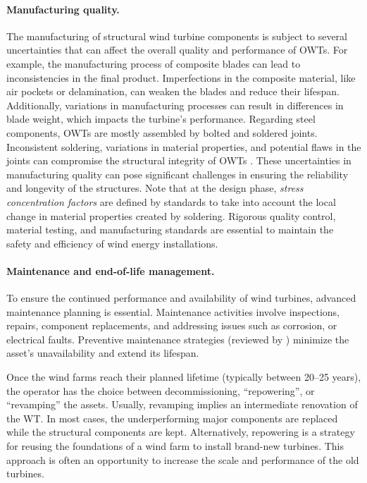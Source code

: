 \paragraph{Manufacturing quality.}
The manufacturing of structural wind turbine components is subject to several uncertainties that can affect the overall quality and performance of OWTs. 
For example, the manufacturing process of composite blades can lead to inconsistencies in the final product. 
Imperfections in the composite material, like air pockets or delamination, can weaken the blades and reduce their lifespan. 
Additionally, variations in manufacturing processes can result in differences in blade weight, which impacts the turbine's performance. 
Regarding steel components, OWTs are mostly assembled by bolted and soldered joints. 
Inconsistent soldering, variations in material properties, and potential flaws in the joints can compromise the structural integrity of OWTs \citep{veers_2019_review}. 
These uncertainties in manufacturing quality can pose significant challenges in ensuring the reliability and longevity of the structures. 
Note that at the design phase, \textit{stress concentration factors} are defined by standards to take into account the local change in material properties created by soldering. 
Rigorous quality control, material testing, and manufacturing standards are essential to maintain the safety and efficiency of wind energy installations. 


\paragraph{Maintenance and end-of-life management.}

To ensure the continued performance and availability of wind turbines, advanced maintenance planning is essential. 
Maintenance activities involve inspections, repairs, component replacements, and addressing issues such as corrosion, or electrical faults. 
Preventive maintenance strategies (reviewed by \citet{ren_2021_owt_maintenance}) minimize the asset's unavailability and extend its lifespan. 

Once the wind farms reach their planned lifetime (typically between 20--25 years), the operator has the choice between decommissioning, ``repowering'', or ``revamping'' the assets. 
Usually, revamping implies an intermediate renovation of the WT. 
In most cases, the underperforming major components are replaced while the structural components are kept. 
Alternatively, repowering is a strategy for reusing the foundations of a wind farm to install brand-new turbines. 
This approach is often an opportunity to increase the scale and performance of the old turbines. 

